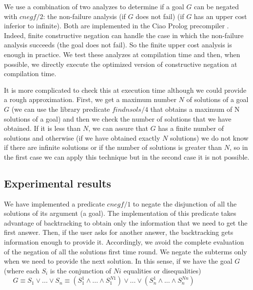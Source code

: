 \documentclass{tlp}
\begin{document}
We use a combination of two analyzes to determine if a goal $G$ can be
 negated with $cnegf/2$: the non-failure analysis (if $G$ does not
 fail) %
 (if $G$ has an upper cost inferior to infinite). Both are implemented
 in the Ciao Prolog precompiler \cite{ciaopp-iclp99-tut}. Indeed,
 finite constructive negation can handle the case in which the
 non-failure analysis succeeds (the goal does not fail). So the finite
 upper cost analysis is enough in practice. We test these analyzes at
 compilation time and then, when possible, we directly execute the
 optimized version of constructive negation at compilation time.


It is more complicated to check this at execution time although we
could provide a rough approximation. First, we get a maximum number
$N$ of solutions of a goal $G$ (we can use the library predicate
$findnsols/4$ that obtains a maximum of N solutions of a goal) and
then we check the number of solutions that we have obtained. If it is
less than $N$, we can assure that $G$ has a finite number of solutions
and otherwise (if we have obtained exactly $N$ solutions) we do not
know if there are infinite solutions or if the number of solutions is
greater than $N$, so in the first case we can apply this technique but
in the second case it is not possible.

\subsection{Experimental results}

We have implemented a predicate $cnegf/1$ to negate the disjunction of
all the solutions of its argument (a goal). The implementation of this
predicate takes advantage of backtracking to obtain only the
information that we need to get the first answer. Then, if the user
asks for another answer, the backtracking gets information enough
to provide it. Accordingly, we avoid the complete evaluation of the
negation of all the solutions first time round. We negate the subterms
only when we need to provide the next solution. In this sense, if we
have the goal $G$ (where each $S_i$ is the conjunction of $Ni$
equalities or disequalities) $~~~~~~G \equiv S_1 \vee ... \vee S_n 
 \equiv (S_1^1 \wedge...\wedge S_1^{N1}) \vee ... \vee (S_n^1
\wedge...\wedge S_n^{Nn}) $
\end{document}
